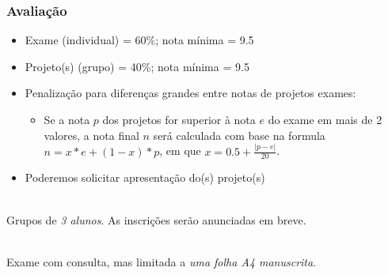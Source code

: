 \documentclass{beamer}
\begin{document}
\begin{frame} 
    \frametitle{Avaliação}
    \begin{itemize}
    \item Exame (individual) = 60\%; nota mínima = 9.5
    \item Projeto(s) (grupo) = 40\%; nota mínima = 9.5
    \item Penalização para diferenças grandes entre notas de projetos exames:
    
    \begin{itemize}
    \item Se a nota $p$ dos projetos for superior à nota $e$ do exame em mais de 2 valores, a nota final $n$ será calculada com base na formula $n = x * e + (1-x) * p$, em que $x = 0.5 + \frac{|p-e|}{20}$.
    \end{itemize}
    
    \item Poderemos solicitar apresentação do(s) projeto(s)
    \end{itemize}
    
    ~\\
    
    Grupos de \emph{3 alunos}. As inscrições serão anunciadas em breve.
    
    ~\\
    
    Exame com consulta, mas limitada a \emph{uma folha A4 manuscrita}.
    
\end{frame}
\end{document}
